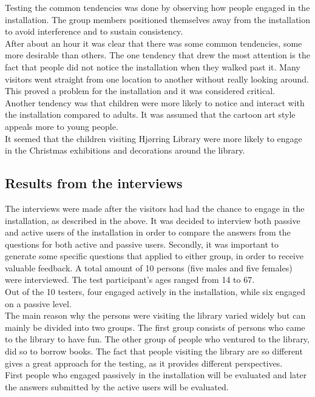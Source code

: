 Testing the common tendencies was done by observing how people engaged in the installation. The group members positioned themselves away from the installation to avoid interference and to sustain consistency.\\ 
After about an hour it was clear that there was some common tendencies, some more desirable than others. The one tendency that drew the most attention is the fact that people did not notice the installation when they walked past it. Many visitors went straight from one location to another without really looking around. This proved a problem for the installation and it was considered critical.\\
Another tendency was that children were more likely to notice and interact with the installation compared to adults. It was assumed that the cartoon art style appeals more to young people.\\
It seemed that the children visiting Hj{\o}rring Library were more likely to engage in the Christmas exhibitions and decorations around the library.

\subsection{Results from the interviews}
The interviews were made after the visitors had had the chance to engage in the installation, as described in the above. It was decided to interview both passive and active users of the installation in order to compare the answers from the questions for both active and passive users. Secondly, it was important to generate some specific questions that applied to either group, in order to receive valuable feedback. A total amount of 10 persons (five males and five females) were interviewed. The test participant's ages ranged from 14 to 67.\\ Out of the 10 testers, four engaged actively in the installation, while six engaged on a passive level.\\
The main reason why the persons were visiting the library varied widely but can mainly be divided into two groups. The first group consists of persons who came to the library to have fun. The other group of people who ventured to the library, did so to borrow books.
The fact that people visiting the library are so different gives a great approach for the testing, as it provides different perspectives.\\
First people who engaged passively in the installation will be evaluated and later the answers submitted by the active users will be evaluated.\\

